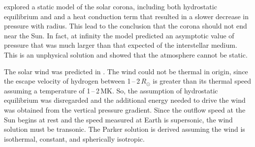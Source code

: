 \citet{Chapman:1957} explored a static model of the solar corona, including both hydrostatic equilibrium and and a heat conduction term that resulted in a slower decrease in pressure with radius. This lead to the conclusion that the corona should not end near the Sun. In fact, at infinity the model predicted an asymptotic value of pressure that was much larger than that expected of the interstellar medium. This is an unphysical solution and showed that the atmosphere cannot be static.

The solar wind was predicted in \cite{Parker:1958}. The wind could not be thermal in origin, since the escape velocity of hydrogen between 1\,--\,2\,$R_{\odot}$ is greater than its thermal speed assuming a temperature of 1\,--\,2\,MK. So, the assumption of hydrostatic equilibrium was disregarded and the additional energy needed to drive the wind was obtained from the vertical pressure gradient. Since the outflow speed at the Sun begins at rest and the speed measured at Earth is supersonic, the wind solution must be transonic. The Parker solution is derived assuming the wind is isothermal, constant, and spherically isotropic.

